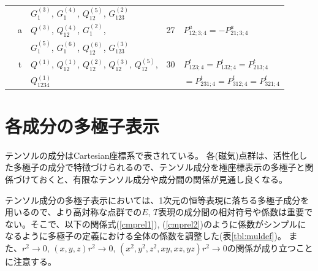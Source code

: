 \documentclass[11pt]{easymemo}
\begin{document}
\begin{table}[ht!]
\begin{center}
\begin{tabular}{cclcl}
  &   & $G_1^{(3)}$, $G_1^{(4)}$, $Q_{12}^{(5)}$, $G_{123}^{(2)}$ \\
  & a & $Q^{(3)}$, $Q_{12}^{(4)}$, $G_1^{(2)}$, & 27 & $P_{12;3;4}^{a}=-P_{21;3;4}^{a}$ \\
  &   & $G_1^{(5)}$, $G_1^{(6)}$, $Q_{12}^{(6)}$, $G_{123}^{(3)}$ & \\
  & t & $Q^{(1)}$, $Q_{12}^{(1)}$, $Q_{12}^{(2)}$, $Q_{12}^{(3)}$, $Q_{12}^{(5)}$, & 30 & $P_{123;4}^{t}=P_{132;4}^{t}=P_{213;4}^{t}$ \\
  &   & $Q_{1234}^{(1)}$ &    & $=P_{231;4}^{t}=P_{312;4}^{t}=P_{321;4}^{t}$ \\
  \hline\hline
\end{tabular}
\end{center}
\end{table}


\section{各成分の多極子表示}

テンソルの成分はCartesian座標系で表されている。
各(磁気)点群は、活性化した多極子の成分で特徴づけられるので、テンソル成分を極座標表示の多極子と関係づけておくと、有限なテンソル成分や成分間の関係が見通し良くなる。

テンソル成分の多極子表示においては、1次元の恒等表現に落ちる多極子成分を用いるので、より高対称な点群での$E$, $T$表現の成分間の相対符号や係数は重要でない。そこで、以下の関係式(\ref{cmprel1}), (\ref{cmprel2})のように係数がシンプルになるように多極子の定義における全体の係数を調整した(表\ref{tbl:muldef})。
また、$r^2\to0$, $(x,y,z)r^2\to0$, $(x^2,y^2,z^2,xy,xz,yz)r^2\to0$の関係が成り立つことに注意する。
\end{document}
